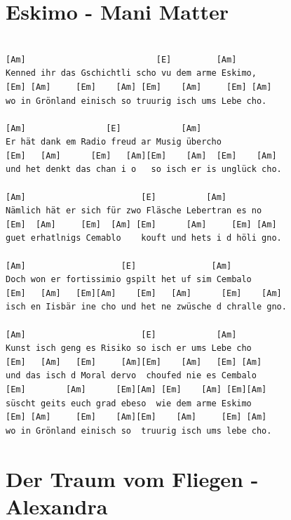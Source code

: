 \documentclass[
]{book}
\let\stdsection\section
\renewcommand\section{\clearpage\stdsection}
\begin{document}
\hypertarget{eskimo---mani-matter}{%
\section{Eskimo - Mani Matter}\label{eskimo---mani-matter}}

\begin{verbatim}

[Am]                          [E]         [Am]
Kenned ihr das Gschichtli scho vu dem arme Eskimo,
[Em] [Am]     [Em]    [Am] [Em]    [Am]     [Em] [Am]
wo in Grönland einisch so truurig isch ums Lebe cho.

[Am]                [E]            [Am]
Er hät dank em Radio freud ar Musig übercho
[Em]   [Am]      [Em]   [Am][Em]    [Am]  [Em]    [Am]
und het denkt das chan i o   so isch er is unglück cho.

[Am]                       [E]          [Am]
Nämlich hät er sich für zwo Fläsche Lebertran es no
[Em]  [Am]     [Em]  [Am] [Em]      [Am]     [Em] [Am]
guet erhatlnigs Cemablo    kouft und hets i d höli gno.

[Am]                   [E]               [Am]
Doch won er fortissimio gspilt het uf sim Cembalo
[Em]   [Am]   [Em][Am]    [Em]   [Am]      [Em]    [Am]
isch en Iisbär ine cho und het ne zwüsche d chralle gno.

[Am]                       [E]            [Am]
Kunst isch geng es Risiko so isch er ums Lebe cho
[Em]   [Am]   [Em]     [Am][Em]    [Am]   [Em] [Am]
und das isch d Moral dervo  choufed nie es Cembalo
[Em]        [Am]      [Em][Am] [Em]    [Am] [Em][Am]
süscht geits euch grad ebeso  wie dem arme Eskimo
[Em] [Am]     [Em]    [Am][Em]    [Am]     [Em] [Am]
wo in Grönland einisch so  truurig isch ums lebe cho.

\end{verbatim}

\hypertarget{der-traum-vom-fliegen---alexandra}{%
\section{Der Traum vom Fliegen - Alexandra}\label{der-traum-vom-fliegen---alexandra}}
\end{document}
